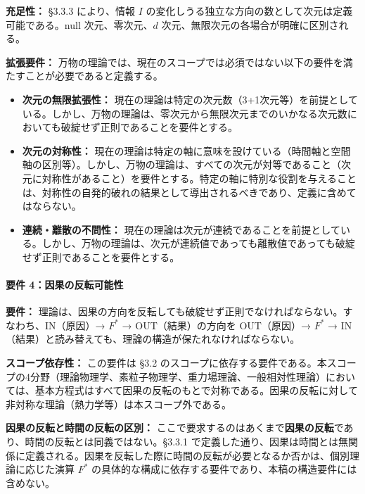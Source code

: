\documentclass[a4paper,11pt]{ltjsarticle}
\providecommand{\tightlist}{\setlength{\itemsep}{0pt}\setlength{\parskip}{0pt}}
\begin{document}
\textbf{充足性：} §3.3.3 により、情報 \(I\)
の変化しうる独立な方向の数として次元は定義可能である。null
次元、零次元、\(d\) 次元、無限次元の各場合が明確に区別される。

\textbf{拡張要件：}
万物の理論では、現在のスコープでは必須ではない以下の要件を満たすことが必要であると定義する。

\begin{itemize}
\tightlist
\item
  \textbf{次元の無限拡張性：}
  現在の理論は特定の次元数（3+1次元等）を前提としている。しかし、万物の理論は、零次元から無限次元までのいかなる次元数においても破綻せず正則であることを要件とする。
\item
  \textbf{次元の対称性：}
  現在の理論は特定の軸に意味を設けている（時間軸と空間軸の区別等）。しかし、万物の理論は、すべての次元が対等であること（次元に対称性があること）を要件とする。特定の軸に特別な役割を与えることは、対称性の自発的破れの結果として導出されるべきであり、定義に含めてはならない。
\item
  \textbf{連続・離散の不問性：}
  現在の理論は次元が連続であることを前提としている。しかし、万物の理論は、次元が連続値であっても離散値であっても破綻せず正則であることを要件とする。
\end{itemize}

\paragraph{要件
4：因果の反転可能性}\label{ux8981ux4ef6-4ux56e0ux679cux306eux53cdux8ee2ux53efux80fdux6027}

\textbf{要件：}
理論は、因果の方向を反転しても破綻せず正則でなければならない。すなわち、\(\mathrm{IN}\)（原因）→
\(F^*\) → \(\mathrm{OUT}\)（結果）の方向を \(\mathrm{OUT}\)（原因）→
\(F^*\) →
\(\mathrm{IN}\)（結果）と読み替えても、理論の構造が保たれなければならない。

\textbf{スコープ依存性：} この要件は §3.2
のスコープに依存する要件である。本スコープの4分野（理論物理学、素粒子物理学、重力場理論、一般相対性理論）においては、基本方程式はすべて因果の反転のもとで対称である。因果の反転に対して非対称な理論（熱力学等）は本スコープ外である。

\textbf{因果の反転と時間の反転の区別：}
ここで要求するのはあくまで\textbf{因果の反転}であり、時間の反転とは同義ではない。§3.3.1
で定義した通り、因果は時間とは無関係に定義される。因果を反転した際に時間の反転が必要となるか否かは、個別理論に応じた演算
\(F^*\) の具体的な構成に依存する要件であり、本稿の構造要件には含めない。
\end{document}
